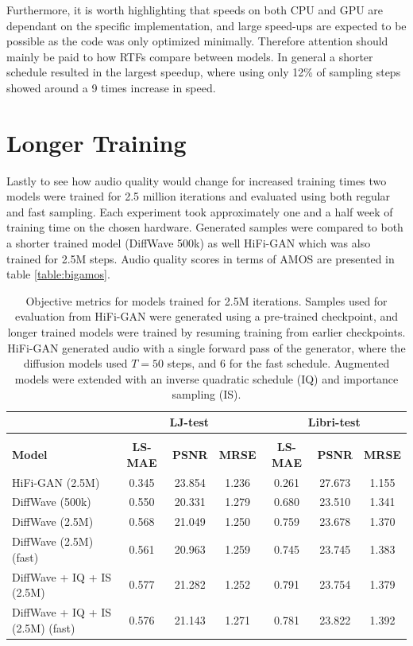 \documentclass{report}
\begin{document}
Furthermore, it is worth highlighting that speeds on both CPU and GPU are dependant on the specific implementation, and large speed-ups are expected to be possible as the code was only optimized minimally. Therefore attention should mainly be paid to how RTFs compare between models. In general a shorter schedule resulted in the largest speedup, where using only 12\% of sampling steps showed around a 9 times increase in speed. 

\section{Longer Training} \label{sec:longer}

Lastly to see how audio quality would change for increased training times two models were trained for 2.5 million iterations and evaluated using both regular and fast sampling. Each experiment took approximately one and a half week of training time on the chosen hardware. Generated samples were compared to both a shorter trained model (DiffWave 500k) as well HiFi-GAN which was also trained for 2.5M steps. Audio quality scores in terms of AMOS are presented in table \ref{table:bigamos}.

\begin{table}[H]
\centering
\def\arraystretch{1.3}
\begin{tabular}{l | c c c | c c c }
\hline
 & \multicolumn{3}{c|}{\textbf{LJ-test}} & \multicolumn{3}{c}{\textbf{Libri-test}} \\
\hline\hline
\vspace{-0.5cm} \\
\textbf{Model} & \textbf{LS-MAE} & \textbf{PSNR} & \textbf{MRSE} & \textbf{LS-MAE} & \textbf{PSNR} & \textbf{MRSE} \\ [0.5ex]
\hline
HiFi-GAN (2.5M) & 0.345 & 23.854 & 1.236 & 0.261 & 27.673 & 1.155 \\
\hline
DiffWave (500k) & 0.550 & 20.331 & 1.279 & 0.680 & 23.510 & 1.341 \\
\hline
\hline
DiffWave (2.5M) & 0.568 & 21.049 & 1.250 & 0.759 & 23.678 & 1.370 \\
\hline
DiffWave (2.5M) (fast) & 0.561 & 20.963 & 1.259 & 0.745 & 23.745 & 1.383 \\
\hline
DiffWave + IQ + IS (2.5M) & 0.577 & 21.282 & 1.252 & 0.791 & 23.754 & 1.379 \\
\hline
DiffWave + IQ + IS (2.5M) (fast) & 0.576 & 21.143 & 1.271 & 0.781 & 23.822 & 1.392 \\
\hline\hline
\end{tabular}
\caption{\onehalfspacing Objective metrics for models trained for 2.5M iterations. Samples used for evaluation from HiFi-GAN were generated using a pre-trained checkpoint, and longer trained models were trained by resuming training from earlier checkpoints. HiFi-GAN generated audio with a single forward pass of the generator, where the diffusion models used $T=50$ steps, and $6$ for the fast schedule. Augmented models were extended with an inverse quadratic schedule (IQ) and importance sampling (IS).}
\label{table:longstats}
\end{table}
\end{document}
